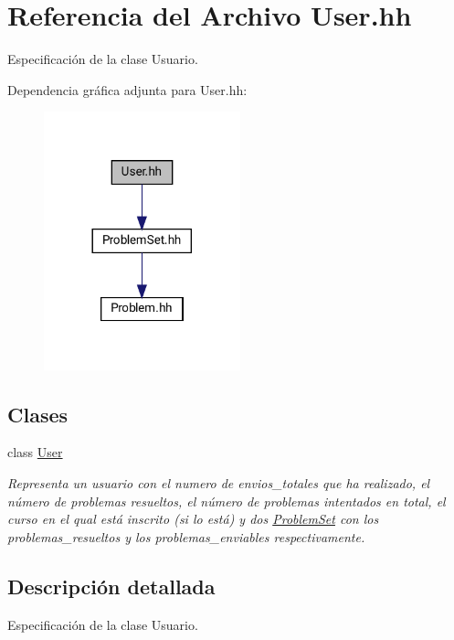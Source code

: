 \hypertarget{_user_8hh}{}\section{Referencia del Archivo User.\+hh}
\label{_user_8hh}


Especificación de la clase Usuario.  


Dependencia gráfica adjunta para User.\+hh\+:\nopagebreak
\begin{figure}[H]
\begin{center}
\leavevmode
\includegraphics[width=161pt]{_user_8hh__incl}
\end{center}
\end{figure}
\subsection*{Clases}
\begin{DoxyCompactItemize}
\item 
class \mbox{\hyperlink{class_user}{User}}
\begin{DoxyCompactList}\small\item\em Representa un usuario con el numero de envios\+\_\+totales que ha realizado, el número de problemas resueltos, el número de problemas intentados en total, el curso en el qual está inscrito (si lo está) y dos \mbox{\hyperlink{class_problem_set}{Problem\+Set}} con los problemas\+\_\+resueltos y los problemas\+\_\+enviables respectivamente. \end{DoxyCompactList}\end{DoxyCompactItemize}


\subsection{Descripción detallada}
Especificación de la clase Usuario. 

